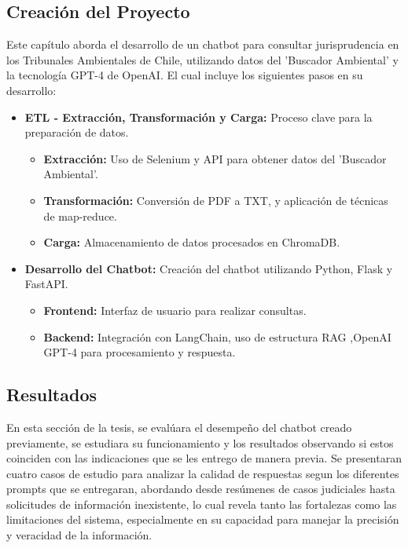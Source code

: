 \subsection{Creación del Proyecto}

Este capítulo aborda el desarrollo de un chatbot para consultar jurisprudencia en los Tribunales Ambientales de Chile, utilizando datos del 'Buscador Ambiental' y la tecnología GPT-4 de OpenAI.
El cual incluye los siguientes pasos en su desarrollo:

\begin{itemize}
    \item \textbf{ETL - Extracción, Transformación y Carga:} Proceso clave para la preparación de datos.
    \begin{itemize}
        \item \textbf{Extracción:} Uso de Selenium y API para obtener datos del 'Buscador Ambiental'.
        \item \textbf{Transformación:} Conversión de PDF a TXT, y aplicación de técnicas de map-reduce.
        \item \textbf{Carga:} Almacenamiento de datos procesados en ChromaDB.
    \end{itemize}

    \item \textbf{Desarrollo del Chatbot:} Creación del chatbot utilizando Python, Flask y FastAPI.
    \begin{itemize}
        \item \textbf{Frontend:} Interfaz de usuario para realizar consultas.
        \item \textbf{Backend:} Integración con LangChain, uso de estructura RAG ,OpenAI GPT-4 para procesamiento y respuesta.
    \end{itemize}
\end{itemize}

\newpage

\subsection{Resultados}

En esta sección de la tesis, se evalúara el desempeño del chatbot creado previamente, se estudiara su funcionamiento y los resultados 
observando si estos coinciden con las indicaciones que se les entrego de manera previa. Se presentaran cuatro 
casos de estudio para analizar la calidad de respuestas segun los diferentes prompts que se entregaran, abordando desde resúmenes de casos judiciales 
hasta solicitudes de información inexistente, lo cual revela tanto las fortalezas como las limitaciones del sistema, 
especialmente en su capacidad para manejar la precisión y veracidad de la información.

